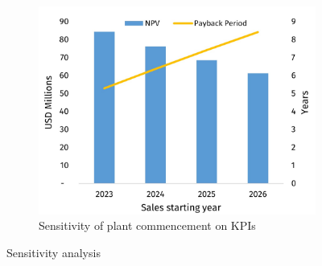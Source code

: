 \begin{figure}
\begin{subfigure}[b]{.45\linewidth}
\includegraphics[width=\linewidth]{chapters/6-economics/figures/Sensitivity_ProductionDelay.jpg}
\caption{Sensitivity of plant commencement on KPIs}\label{Sensitivity_ProductionDelay}
\end{subfigure}

\caption{Sensitivity analysis}
\label{Sensitivity}
\end{figure}

